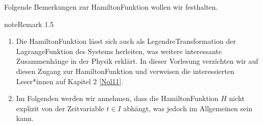 \documentclass[letterpaper,10pt,english]{jupyterBook}
\begin{document}
\sphinxAtStartPar
Folgende Bemerkungen zur Hamilton\sphinxhyphen{}Funktion wollen wir festhalten.
\label{ode/hamilton:remark-1}
\begin{sphinxadmonition}{note}{Remark 1.5}


\begin{enumerate}
%
\item {} 
\sphinxAtStartPar
Die Hamilton\sphinxhyphen{}Funktion lässt sich auch als Legendre\sphinxhyphen{}Transformation der Lagrange\sphinxhyphen{}Funktion des Systems herleiten, was weitere interessante Zusammenhänge in der Physik erklärt.
In dieser Vorlesung verzichten wir auf diesen Zugang zur Hamilton\sphinxhyphen{}Funktion und verweisen die interessierten Leser*innen auf Kapitel 2 {[}\hyperlink{cite.references:id9}{Nol11}{]}.

\item {} 
\sphinxAtStartPar
Im Folgenden werden wir annehmen, dass die Hamilton\sphinxhyphen{}Funktion \(H\) nicht explizit von der Zeitvariable \(t \in I\) abhängt, was jedoch im Allgemeinen sein kann.

\end{enumerate}
\end{sphinxadmonition}
\end{document}

